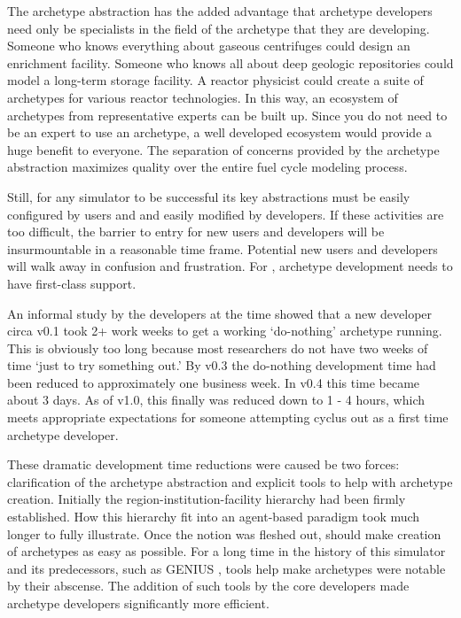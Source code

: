 The archetype abstraction has the added advantage that archetype developers 
need only be specialists in the field of the archetype that they are developing.
Someone who knows everything about gaseous centrifuges could design 
an enrichment facility. Someone who knows all about deep geologic repositories
could model a long-term storage facility. A reactor physicist could create 
a suite of archetypes for various reactor technologies. In this way, an ecosystem 
of archetypes from representative experts can be built up. Since you do not need
to be an expert to use an archetype, a well developed ecosystem would provide 
a huge benefit to everyone. The separation of concerns provided by the archetype 
abstraction maximizes quality over the entire fuel cycle modeling process.

Still, for any simulator to be successful its key abstractions must be easily 
configured by users and and easily modified by developers.  If these activities are 
too difficult, the barrier to entry for new users and developers will be 
insurmountable in a reasonable time frame. Potential new users and developers will 
walk away in confusion and frustration. For \cyclus, archetype development
needs to have first-class support.

An informal study 
by the developers at the time showed that a new developer circa \cyclus v0.1
took 2+ work weeks to get a working `do-nothing' archetype running. This is obviously 
too long because most researchers do not have two weeks of time `just to try 
something out.' By \cyclus v0.3 the do-nothing development time had been reduced 
to approximately one business week. In \cyclus v0.4 this time became about 3 days.
As of \cyclus v1.0, this finally was reduced down to 1 - 4 hours, which meets
appropriate expectations for someone attempting cyclus out as a first time archetype 
developer.

These dramatic development time reductions were caused be two forces:
clarification of the archetype abstraction and explicit tools to help with 
archetype creation. Initially the region-institution-facility hierarchy 
had been firmly established. How this hierarchy fit into an agent-based 
paradigm took much longer to fully illustrate. Once the notion was fleshed out,
\Cyclus should make creation of archetypes as easy as possible. 
For a long time in the history of this simulator and its predecessors, such as 
GENIUS \citeme, tools help make archetypes were notable by their abscense. 
The addition of such tools by the \cyclus core developers made archetype
developers significantly more efficient.

